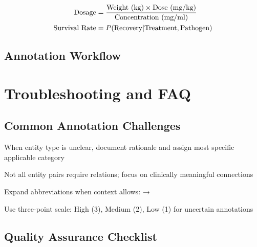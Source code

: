 \documentclass[11pt,a4paper]{article}
\begin{document}
\begin{align}
\text{Dosage} &= \frac{\text{Weight (kg)} \times \text{Dose (mg/kg)}}{\text{Concentration (mg/ml)}} \\
\text{Survival Rate} &= P(\text{Recovery}|\text{Treatment}, \text{Pathogen})
\end{align}

\subsection{Annotation Workflow}

\resetrowcolor
\begin{guidelinetable}
\end{guidelinetable}

\section{Troubleshooting and FAQ}

\subsection{Common Annotation Challenges}

\begin{termlist}
    \item[Ambiguous Entities] When entity type is unclear, document rationale and assign most specific applicable category
    \item[Missing Relations] Not all entity pairs require relations; focus on clinically meaningful connections
    \item[Abbreviation Handling] Expand abbreviations when context allows:  → 
    \item[Confidence Scoring] Use three-point scale: High (3), Medium (2), Low (1) for uncertain annotations
\end{termlist}

\subsection{Quality Assurance Checklist}
\end{document}
